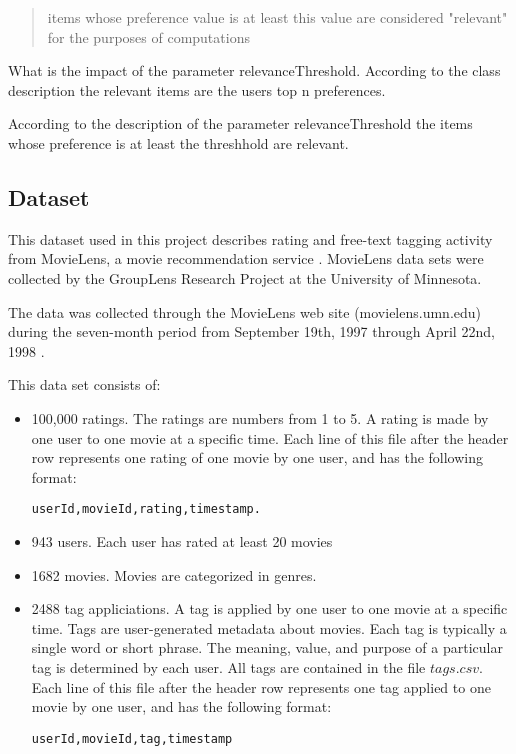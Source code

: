\begin{quote}
  items whose preference value is at least this value are considered "relevant" for the purposes of computations
\end{quote}

What is the impact of the parameter relevanceThreshold. According to the class description the relevant items are the users top n preferences. 

According to the description of the parameter relevanceThreshold the items whose preference is at least the threshhold are relevant. 



\subsection{Dataset}
\label{sec:dataset}

This dataset used in this project describes rating and free-text tagging activity from MovieLens, a movie recommendation service \cite{movielensdata}.
MovieLens data sets were collected by the GroupLens Research Project at the University of Minnesota.

The data was collected through the MovieLens web site (movielens.umn.edu) during the seven-month period from September 19th, 1997 through April 22nd, 1998 \cite{movielensdata}.
 
This data set consists of:
\begin{itemize}
\item 100,000 ratings. The ratings are numbers from 1 to 5. A rating is made by one user to one movie at a specific time. Each line of this file after the header row represents one rating of one movie by one user, and has the following format:
\begin{verbatim}
userId,movieId,rating,timestamp.
\end{verbatim}
\item 943 users. Each user has rated at least 20 movies
\item 1682 movies. Movies are categorized in genres. 
\item 2488 tag appliciations. A tag is applied by one user to one movie at a specific time. Tags are user-generated metadata about movies. Each tag is typically a single word or short phrase. The meaning, value, and purpose of a particular tag is determined by each user. All tags are contained in the file $tags.csv$. Each line of this file after the header row represents one tag applied to one movie by one user, and has the following format:
\begin{verbatim}
userId,movieId,tag,timestamp
\end{verbatim}
\end{itemize}

